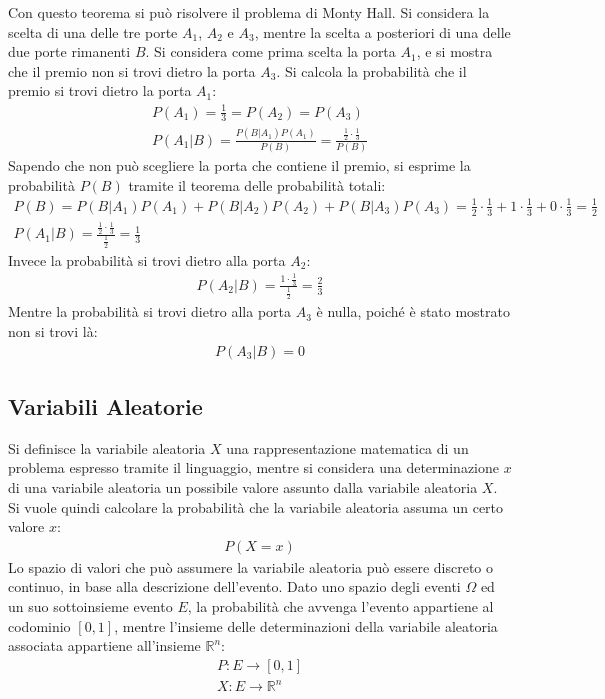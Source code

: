 \documentclass{article}
\numberwithin{equation}{subsection}
\begin{document}
Con questo teorema si può risolvere il problema di Monty Hall. Si considera la scelta di una delle tre porte $A_1$, $A_2$ e $A_3$, mentre la scelta a posteriori di una delle 
due porte rimanenti $B$. Si considera come prima scelta la porta $A_1$, e si mostra che il premio non si trovi dietro la porta $A_3$. Si calcola la probabilità che il premio 
si trovi dietro la porta $A_1$: 
\begin{gather*}
    P(A_1)=\displaystyle\frac{1}{3}=P(A_2)=P(A_3)\\
    P(A_1|B)=\displaystyle\frac{P(B|A_1)P(A_1)}{P(B)}=\frac{\displaystyle\frac{1}{2}\cdot{\frac{1}{3}}}{P(B)}
\end{gather*}
Sapendo che non può scegliere la porta che contiene il premio, si esprime la probabilità $P(B)$ tramite il teorema delle probabilità totali:
\begin{gather*}
    P(B)=P(B|A_1)P(A_1)+P(B|A_2)P(A_2)+P(B|A_3)P(A_3)=\displaystyle\frac{1}{2}\cdot\frac{1}{3}+1\cdot\frac{1}{3}+0\cdot\frac{1}{3}=\frac{1}{2}\\
    P(A_1|B)=\frac{\displaystyle\frac{1}{2}\cdot{\frac{1}{3}}}{\displaystyle\frac{1}{2}}=\frac{1}{3}
\end{gather*}
Invece la probabilità si trovi dietro alla porta $A_2$:
\begin{gather*}
    P(A_2|B)=\displaystyle\frac{1\cdot\displaystyle\frac{1}{3}}{\displaystyle\frac{1}{2}}=\frac{2}{3}
\end{gather*}
Mentre la probabilità si trovi dietro alla porta $A_3$ è nulla, poiché è stato mostrato non si trovi là:
\begin{gather*}
    P(A_3|B)=0
\end{gather*}

\subsection{Variabili Aleatorie}

Si definisce la variabile aleatoria $X$ una rappresentazione matematica di un problema espresso tramite il linguaggio, mentre si considera una determinazione $x$ di una variabile aleatoria 
un possibile 
valore assunto dalla variabile aleatoria $X$. Si vuole quindi calcolare la probabilità che la variabile aleatoria assuma un certo valore $x$:
\begin{gather*}
    P(X=x)
\end{gather*}
Lo spazio di valori che può assumere la variabile aleatoria può essere discreto o continuo, in base alla descrizione dell'evento. Dato uno spazio degli eventi $\Omega$ ed 
un suo sottoinsieme evento $E$, la probabilità che avvenga l'evento appartiene al codominio $[0,1]$, mentre l'insieme delle determinazioni della variabile aleatoria 
associata appartiene all'insieme $\mathbb{R}^n$:
\begin{gather*}
    P: E\to[0,1]\\
    X:E\to\mathbb{R}^n
\end{gather*}
\end{document}
